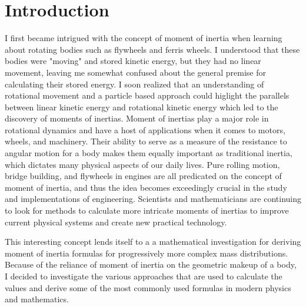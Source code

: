\section{Introduction}
\label{sec:introduction}
I first became intrigued with the concept of moment of inertia when learning about rotating bodies such as flywheels and ferris wheels. I understood that these bodies were "moving" and stored kinetic energy, but they had no linear movement, leaving me somewhat confused about the general premise for calculating their stored energy. I soon realized that an understanding of rotational movement and a particle based approach could higlight the parallels between linear kinetic energy and rotational kinetic energy which led to the discovery of moments of inertias. Moment of inertias play a major role in rotational dynamics and have a host of applications when it comes to motors, wheels, and machinery.  Their ability to serve as a measure of the resistance to angular motion for a body makes them equally important as traditional inertia, which dictates many physical aspects of our daily lives. Pure rolling motion, bridge building, and flywheels in engines are all predicated on the concept of moment of inertia, and thus the idea becomes exceedingly crucial in the study and implementations of engineering. Scientists and mathematicians are continuing to look for methods to calculate more intricate moments of inertias to improve current physical systems and create new practical technology.


This interesting concept lends itself to a a mathematical investigation for deriving moment of inertia formulas for progressively more complex mass distributions. Because of the reliance of moment of inertia on the geometric makeup of a body, I decided to investigate the various approaches that are used to calculate the values and derive some of the most commonly used formulas in modern physics and mathematics.